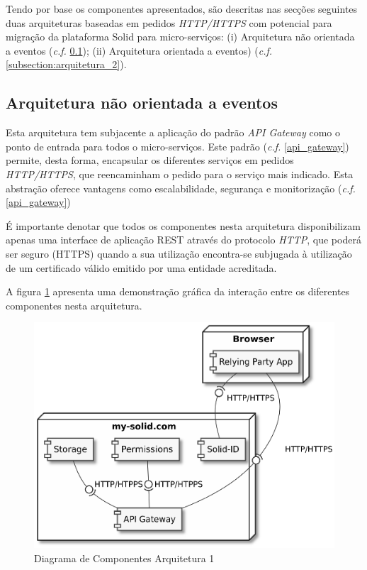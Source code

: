 Tendo por base os componentes apresentados, são descritas nas secções seguintes duas arquiteturas baseadas em pedidos \emph{HTTP/HTTPS} com potencial para migração da plataforma Solid para micro-serviços: (i) Arquitetura não orientada a eventos  (\emph{c.f.} \ref{subsection:arquitetura_1}); (ii) Arquitetura orientada a eventos) (\emph{c.f.} \ref{subsection:arquitetura_2}).

\subsection{Arquitetura não orientada a eventos} \label{subsection:arquitetura_1}

Esta arquitetura tem subjacente a aplicação do padrão \emph{API Gateway} como o ponto de entrada para todos o micro-serviços. Este padrão (\emph{c.f.} \ref{api_gateway}) permite, desta forma, encapsular os diferentes serviços em pedidos \emph{HTTP/HTTPS}, que reencaminham o pedido para o serviço mais indicado. Esta abstração oferece vantagens como escalabilidade, segurança e monitorização (\emph{c.f.} \ref{api_gateway})

É importante denotar que todos os componentes nesta arquitetura disponibilizam apenas uma interface de aplicação REST através do protocolo \emph{HTTP}, que poderá ser seguro (HTTPS) quando a sua utilização encontra-se subjugada à utilização de um certificado válido emitido por uma entidade acreditada.

A figura \ref{component_diagram_arquitetura1} apresenta uma demonstração gráfica da interação entre os diferentes componentes nesta arquitetura.

\begin{figure}[H]
    \begin{center}
    \includegraphics[width=1 \textwidth]{figures/arquitetura_1_diagrama_componentes.eps}
    \caption{Diagrama de Componentes Arquitetura 1}
    \label{component_diagram_arquitetura1}
    \end{center}
\end{figure}

